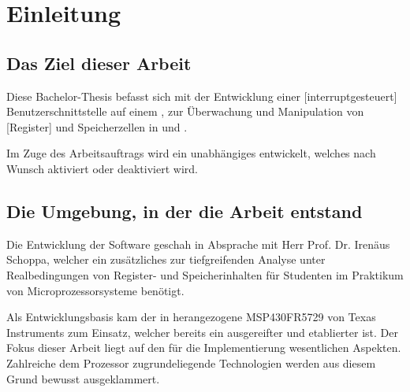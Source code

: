 
\chapter{Einleitung}
\label{cha:Einleitung}

\section{Das Ziel dieser Arbeit}
\label{sec:ZielDerArbeit}

Diese Bachelor-Thesis befasst sich mit der Entwicklung einer [interruptgesteuert] Benutzerschnittstelle auf einem , zur \"Uberwachung und Manipulation von [Register] und Speicherzellen in  und .

Im Zuge des Arbeitsauftrags wird ein unabh\"angiges  entwickelt, welches nach Wunsch aktiviert oder deaktiviert wird.

\section{Die Umgebung, in der die Arbeit entstand}
\label{sec:EntstehungsUmgebungArbeit}

Die Entwicklung der Software geschah in Absprache mit Herr Prof. Dr. Iren\"aus Schoppa, welcher ein zus\"atzliches  zur tiefgreifenden Analyse unter Realbedingungen von Register- und Speicherinhalten f\"ur Studenten im Praktikum von Microprozessorsysteme ben\"otigt.

Als Entwicklungsbasis kam der in  herangezogene MSP430FR5729 von Texas Instruments zum Einsatz, welcher bereits ein ausgereifter und etablierter  ist. Der Fokus dieser Arbeit liegt auf den f\"ur die Implementierung wesentlichen Aspekten. Zahlreiche dem Prozessor zugrundeliegende Technologien werden aus diesem Grund bewusst ausgeklammert. 

